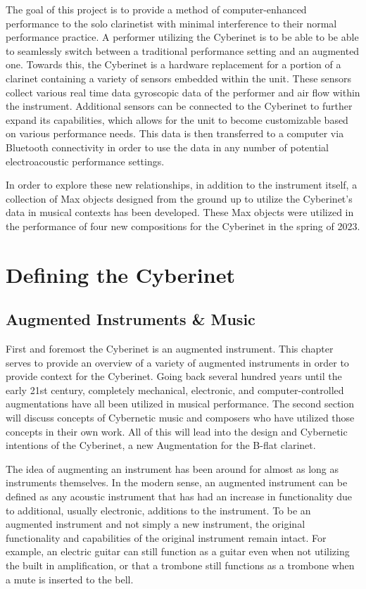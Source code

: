 The goal of this project is to provide a method of computer-enhanced performance to the solo clarinetist with minimal interference to their normal performance practice. A performer utilizing the Cyberinet is to be able to be able to seamlessly switch between a traditional performance setting and an augmented one. Towards this, the Cyberinet is a hardware replacement for a portion of a clarinet containing a variety of sensors embedded within the unit. These sensors collect various real time data gyroscopic data of the performer and air flow within the instrument. Additional sensors can be connected to the Cyberinet to further expand its capabilities, which allows for the unit to become customizable based on various performance needs. This data is then transferred to a computer via Bluetooth connectivity in order to use the data in any number of potential electroacoustic performance settings. 

In order to explore these new relationships, in addition to the instrument itself, a collection of Max objects designed from the ground up to utilize the Cyberinet’s data in musical contexts has been developed. These Max objects were utilized in the performance of four new compositions for the Cyberinet in the spring of 2023.

\mainmatter
\chapter{Defining the Cyberinet}

\section{Augmented Instruments \& Music}

First and foremost the Cyberinet is an augmented instrument. This chapter serves to provide an overview of a variety of augmented instruments in order to provide context for the Cyberinet. Going back several hundred years until the early 21st century, completely mechanical, electronic, and computer-controlled augmentations have all been utilized in musical performance. The second section will discuss concepts of Cybernetic music and composers who have utilized those concepts in their own work. All of this will lead into the design and Cybernetic intentions of the Cyberinet, a new Augmentation for the B-flat clarinet.

The idea of augmenting an instrument has been around for almost as long as instruments themselves. In the modern sense, an augmented instrument can be defined as any acoustic instrument that has had an increase in functionality due to additional, usually electronic, additions to the instrument. To be an augmented instrument and not simply a new instrument, the original functionality and capabilities of the original instrument remain intact\cite{miranda_Wanderley_instrumentControl_2006}. For example, an electric guitar can still function as a guitar even when not utilizing the built in amplification, or that a trombone still functions as a trombone when a mute is inserted to the bell.



